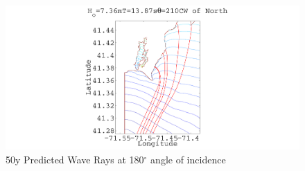 \documentclass[10pt,letterpaper,titlepage]{report}
\begin{document}
\begin{appendices}
\begin{figure}[H]
\centering
\includegraphics[width=1.0\textwidth]{./img/50y_210deg.pdf}
\caption{50y Predicted Wave Rays at 180$^{\circ}$ angle of incidence}
\label{fig:50y210deg}
\end{figure}


\end{appendices}
\end{document}
